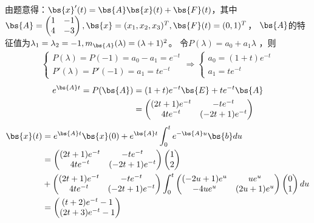 \documentclass[12pt, a4paper, oneside, UTF8]{ctexbook}
\begin{document}
\begin{solution}
    由题意得：$\bs{x}'(t)=\bs{A}\bs{x}(t)+\bs{F}(t)$，其中$\bs{A}=\begin{pmatrix}
        1 & -1\\
        4 &-3
    \end{pmatrix},\bs{x}=(x_1,x_2,x_3)^T,\bs{F}(t)=(0,1)^T$，
    $\bs{A}$的特征值为$\lambda_1=\lambda_2=-1,m_{\bs{A}}(\lambda)=(\lambda+1)^2$。
    令$P(\lambda)=a_0+a_1\lambda$
    ，则 \begin{align*}
        \left\{
            \begin{array}{ll}
                P(\lambda)=P(-1)=a_0-a_1=e^{-t}\\
                P'(\lambda)=P'(-1)=a_1=te^{-t}
            \end{array}
            \right.
        \Rightarrow
        \left\{
            \begin{array}{ll}
                a_0=(1+t)e^{-t}\\
                a_1=te^{-t}
            \end{array}
            \right.
    \end{align*}
    \begin{align*}
        e^{\bs{A}t}=P(\bs{A})
    &=(1+t)e^{-t}\bs{E}+te^{-t}\bs{A}\\
    &=\begin{pmatrix}
        (2t+1)e^{-t} &-te^{-t} \\
        4te^{-t}  & (-2t+1)e^{-t}
    \end{pmatrix}
    \end{align*}
    \begin{align*}
    \bs{x}(t)&=e^{\bs{A}t}\bs{x}(0)+e^{\bs{A}t}\int_{0}^t e^{-\bs{A}u}\bs{b} du\\
    &=\begin{pmatrix}
        (2t+1)e^{-t} &-te^{-t} \\
        4te^{-t}  & (-2t+1)e^{-t}
    \end{pmatrix}\begin{pmatrix}
        1 \\
        2
    \end{pmatrix}\\
    &+\begin{pmatrix}
        (2t+1)e^{-t} &-te^{-t} \\
        4te^{-t}  & (-2t+1)e^{-t}
    \end{pmatrix}\int_{0}^t 
    \begin{pmatrix}
        (-2u+1)e^{u} &ue^{u} \\
        -4ue^{u}  & (2u+1)e^{u}
    \end{pmatrix} \begin{pmatrix}
        0\\
        1
    \end{pmatrix} du \\
    &=\begin{pmatrix}
        (t+2)e^{-t}-1 \\
        (2t+3)e^{-t}-1
    \end{pmatrix}
    \end{align*}
\end{solution}
\end{document}
